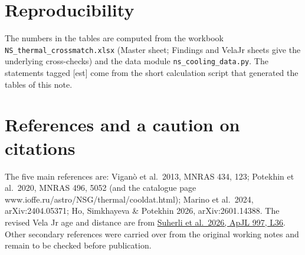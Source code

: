 \documentclass[11pt,a4paper]{article}
\newcommand{\src}[1]{\textsf{[#1]}}
\begin{document}
\section{Reproducibility}
The numbers in the tables are computed from the workbook \texttt{NS\_thermal\_crossmatch.xlsx} (Master sheet; Findings and VelaJr sheets give the underlying cross-checks) and the data module \texttt{ns\_cooling\_data.py}. The statements tagged \src{est} come from the short calculation script that generated the tables of this note.

\section*{References and a caution on citations}
The five main references are: Vigan\`o et al.\ 2013, MNRAS 434, 123; Potekhin et al.\ 2020, MNRAS 496, 5052 (and the catalogue page www.ioffe.ru/astro/NSG/thermal/cooldat.html); Marino et al.\ 2024, arXiv:2404.05371; Ho, Simkhayeva \& Potekhin 2026, arXiv:2601.14388. The revised Vela Jr age and distance are from \href{https://doi.org/10.3847/2041-8213/ae27c4}{Suherli et al.\ 2026, ApJL 997, L36}. Other secondary references were carried over from the original working notes and remain to be checked before publication.
\end{document}
